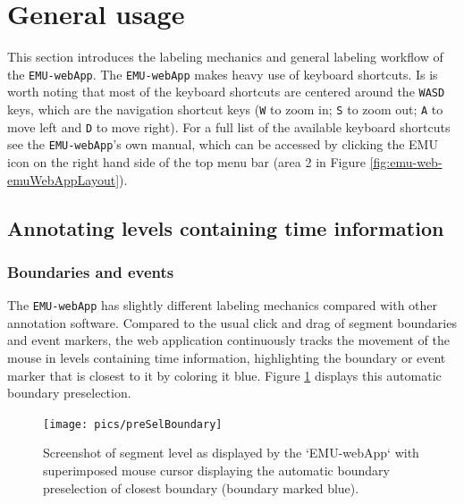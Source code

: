 \documentclass[]{book}
\begin{document}
\hypertarget{sec:webApp-generalUsage}{%
\section{General usage}\label{sec:webApp-generalUsage}}

This section introduces the labeling mechanics and general labeling workflow of the \texttt{EMU-webApp}. The \texttt{EMU-webApp} makes heavy use of keyboard shortcuts. Is is worth noting that most of the keyboard shortcuts are centered around the \texttt{WASD} keys, which are the navigation shortcut keys (\texttt{W} to zoom in; \texttt{S} to zoom out; \texttt{A} to move left and \texttt{D} to move right). For a full list of the available keyboard shortcuts see the \texttt{EMU-webApp}'s own manual, which can be accessed by clicking the EMU icon on the right hand side of the top menu bar (area 2 in Figure \ref{fig:emu-web-emuWebAppLayout}).

\hypertarget{annotating-levels-containing-time-information}{%
\subsection{Annotating levels containing time information}\label{annotating-levels-containing-time-information}}

\hypertarget{boundaries-and-events}{%
\subsubsection{Boundaries and events}\label{boundaries-and-events}}

The \texttt{EMU-webApp} has slightly different labeling mechanics compared with other annotation software. Compared to the usual click and drag of segment boundaries and event markers, the web application continuously tracks the movement of the mouse in levels containing time information, highlighting the boundary or event marker that is closest to it by coloring it blue. Figure \ref{fig:webApp-preSelBoundary} displays this automatic boundary preselection.

\begin{figure}

{\centering \texttt{[image: pics/preSelBoundary]} 

}

\caption{Screenshot of segment level as displayed by the `EMU-webApp` with superimposed mouse cursor displaying the automatic boundary preselection of closest boundary (boundary marked blue).}\label{fig:webApp-preSelBoundary}
\end{figure}
\end{document}
